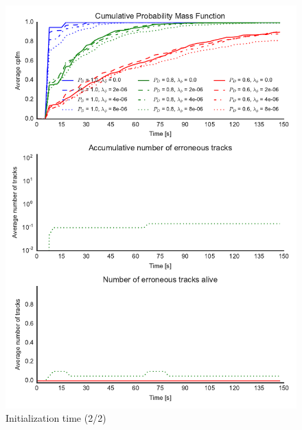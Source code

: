 \begin{figure}
\centering
\includegraphics{Figures/plots/Scenario1_Init-Time(2-2).pdf}
\caption{Initialization time (2/2)}\label{fig:init_time_2-2}
\end{figure}

